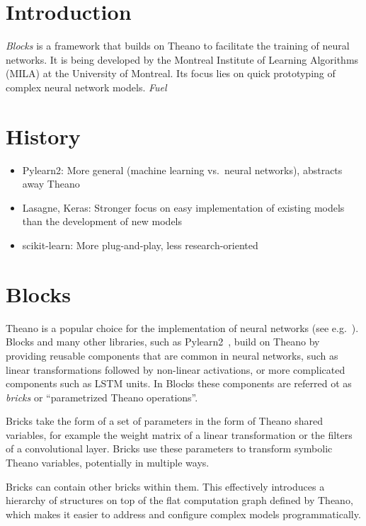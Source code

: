 \documentclass[twoside,11pt]{article}
\begin{document}
\section{Introduction}

\emph{Blocks} is a framework that builds on Theano to facilitate the training of
neural networks. It is being developed by the Montreal Institute of Learning
Algorithms (MILA) at the University of Montreal. Its focus lies on quick
prototyping of complex neural network models. \emph{Fuel} 

\section{History}


\begin{itemize}
  \item Pylearn2: More general (machine learning vs.\ neural networks), abstracts
    away Theano
  \item Lasagne, Keras: Stronger focus on easy implementation of existing models
    than the development of new models
  \item scikit-learn: More plug-and-play, less research-oriented
\end{itemize}

\section{Blocks}

Theano is a popular choice for the implementation of neural networks (see
e.g.~\cite{Goodfellow-et-al-ICML2013, Pascanu-et-al-ICML2013}). Blocks and many
other libraries, such as Pylearn2~\cite{pylearn2_arxiv_2013}, build on Theano
by providing reusable components that are common in neural networks, such as
linear transformations followed by non-linear activations, or more complicated
components such as LSTM units. In Blocks these components are referred ot as
\emph{bricks} or ``parametrized Theano operations''.

Bricks take the form of a set of parameters in the form of Theano shared
variables, for example the weight matrix of a linear transformation or the
filters of a convolutional layer. Bricks use these parameters to transform
symbolic Theano variables, potentially in multiple ways. %

Bricks can contain other bricks within them. This effectively introduces a
hierarchy of structures on top of the flat computation graph defined by Theano,
which makes it easier to address and configure complex models programmatically.
\end{document}
